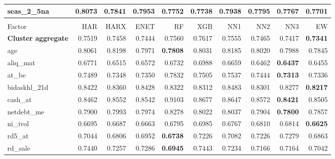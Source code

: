 \begin{longtable}{>{\raggedright\arraybackslash}p{2.6cm}rrrrrrrrr}
seas\_2\_5na & 0.8073 & \cellcolor{blue!10}0.7841 & \cellcolor{blue!10}0.7953 & \cellcolor{blue!10}0.7752 & \cellcolor{blue!10}0.7738 & \cellcolor{blue!10}0.7938 & \cellcolor{blue!10}0.7795 & \cellcolor{blue!10}0.7767 & \textbf{\cellcolor{blue!10}0.7701} \\
\hline
\multicolumn{10}{@{}l}{\textit{Panel D. Low Leverage}} \\
\hline
Factor & HAR & HARX & ENET & RF & XGB & NN1 & NN2 & NN3 & EW \\
\hline
\textbf{Cluster aggregate} & 0.7519 & \cellcolor{blue!10}0.7458 & \cellcolor{blue!10}0.7444 & 0.7560 & 0.7617 & 0.7555 & \cellcolor{blue!10}0.7465 & \cellcolor{blue!10}0.7417 & \textbf{\cellcolor{blue!10}0.7341} \\
age & 0.8061 & 0.8198 & \cellcolor{blue!10}0.7971 & \textbf{\cellcolor{blue!10}0.7808} & \cellcolor{blue!10}0.8031 & 0.8185 & \cellcolor{blue!10}0.8020 & \cellcolor{blue!10}0.7988 & \cellcolor{blue!10}0.7845 \\
aliq\_mat & 0.6771 & \cellcolor{blue!10}0.6515 & \cellcolor{blue!10}0.6572 & \cellcolor{blue!10}0.6732 & 0.6988 & \cellcolor{blue!10}0.6659 & \cellcolor{blue!10}0.6462 & \textbf{\cellcolor{blue!10}0.6437} & \cellcolor{blue!10}0.6455 \\
at\_be & 0.7489 & \cellcolor{blue!10}0.7348 & \cellcolor{blue!10}0.7350 & 0.7832 & 0.7505 & 0.7537 & \cellcolor{blue!10}0.7444 & \textbf{\cellcolor{blue!10}0.7313} & \cellcolor{blue!10}0.7336 \\
bidaskhl\_21d & 0.8422 & \cellcolor{blue!10}0.8360 & 0.8428 & \cellcolor{blue!10}0.8322 & \cellcolor{blue!10}0.8312 & 0.8483 & \cellcolor{blue!10}0.8301 & \cellcolor{blue!10}0.8277 & \textbf{\cellcolor{blue!10}0.8217} \\
cash\_at & 0.8462 & 0.8552 & 0.8542 & 0.9103 & 0.8677 & 0.8647 & 0.8572 & \textbf{\cellcolor{blue!10}0.8421} & 0.8505 \\
netdebt\_me & 0.7900 & 0.7993 & 0.7974 & 0.8278 & 0.8022 & 0.8037 & 0.7904 & \textbf{\cellcolor{blue!10}0.7800} & \cellcolor{blue!10}0.7857 \\
ni\_ivol & 0.6695 & \cellcolor{blue!10}0.6687 & \cellcolor{blue!10}0.6663 & 0.6795 & 0.6985 & 0.6767 & 0.6810 & 0.6814 & \textbf{\cellcolor{blue!10}0.6625} \\
rd5\_at & 0.7044 & \cellcolor{blue!10}0.6806 & \cellcolor{blue!10}0.6952 & \textbf{\cellcolor{blue!10}0.6738} & 0.7226 & 0.7082 & 0.7226 & 0.7279 & \cellcolor{blue!10}0.6863 \\
rd\_sale & 0.7440 & \cellcolor{blue!10}0.7257 & \cellcolor{blue!10}0.7286 & \textbf{\cellcolor{blue!10}0.6945} & 0.7443 & \cellcolor{blue!10}0.7234 & \cellcolor{blue!10}0.7166 & \cellcolor{blue!10}0.7164 & \cellcolor{blue!10}0.7042 \\

\end{longtable}
